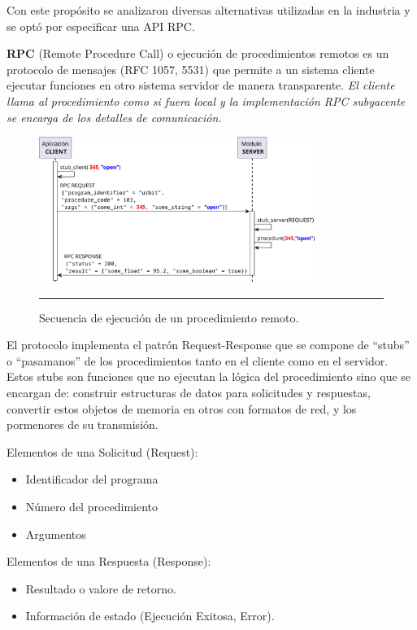 Con este propósito se analizaron diversas alternativas utilizadas en la industria y se optó por especificar una API RPC.

\textbf{RPC} (Remote Procedure Call) o ejecución de procedimientos remotos es un protocolo de mensajes (RFC 1057, 5531) que permite a un sistema cliente ejecutar funciones en otro sistema servidor de manera transparente. 
\emph{El cliente llama al procedimiento como si fuera local y la implementación RPC subyacente se encarga de los detalles de comunicación.}

\begin{figure}[htbp]
	\centering
	\includegraphics[width=0.8\textwidth]{Figures/design/SEQ_rpc_ink.png}
	\rule{35em}{1pt}
	\caption[Connection Diagram]{Secuencia de ejecución de un procedimiento remoto.}
	\label{fig:seq_rpc}
\end{figure}

El protocolo implementa el patrón Request-Response que se compone de ``stubs'' o ``pasamanos'' de los procedimientos tanto en el cliente como en el servidor. Estos stubs son funciones que no ejecutan la lógica del procedimiento sino que se encargan de: construir estructuras de datos para solicitudes y respuestas, convertir estos objetos de memoria en otros con formatos de red, y los pormenores de su transmisión.


Elementos de una Solicitud (Request):
\begin{itemize}
	\item Identificador del programa
	\item Número del procedimiento
	\item Argumentos
\end{itemize}

Elementos de una Respuesta (Response):
\begin{itemize}
	\item Resultado o valore de retorno.
	\item Información de estado (Ejecución Exitosa, Error).
\end{itemize}

